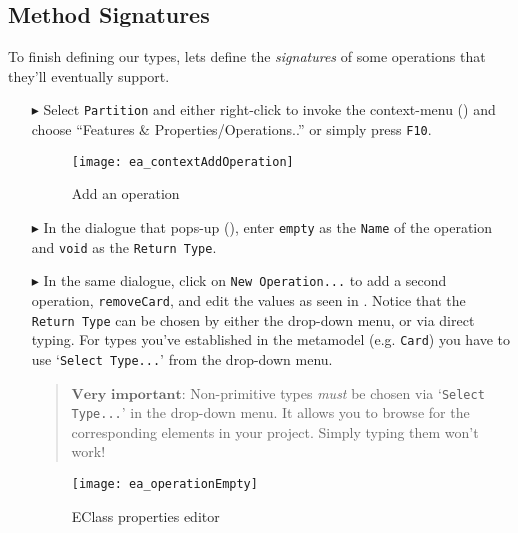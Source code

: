 \newpage
\subsection{Method Signatures}
\genHeader
\hypertarget{static:methods vis}{}

To finish defining our types, lets define the \emph{signatures} of some operations that they'll eventually support.

\begin{enumerate}

\item[$\blacktriangleright$] Select \texttt{Partition} and either right-click to invoke the context-menu ()  and choose ``Features \&
Properties/Operations..'' or simply press \texttt{F10}.

\begin{figure}[htbp]
	\centering
  \texttt{[image: ea\_contextAddOperation]}
	\caption{Add an operation}
	\label{ea:add_operation}
\end{figure}
\FloatBarrier

\item[$\blacktriangleright$] In the dialogue that pops-up (), enter \texttt{empty} as the \texttt{Name} of the operation and \texttt{void} as the \texttt{Return Type}.

\vspace{0.5cm}

\item[$\blacktriangleright$] In the same dialogue, click on \texttt{New Operation...} to add a second operation, \texttt{removeCard}, and edit the values as seen in 
. Notice that the \texttt{Return Type} can be chosen by either the drop-down menu, or via direct typing. For types you've established in
the metamodel (e.g. \texttt{Card}) you have to use `\texttt{Select Type...}' from the drop-down menu.
\vspace{-.3cm}
\begin{quote}
{ \small
$\textbf{Very important:}$ Non-primitive types \emph{must} be chosen via `\texttt{Select Type...}' in the drop-down menu. It allows you to browse for the corresponding elements in
your project. Simply typing them won't work!
}
\end{quote}

\begin{figure}[htbp]
	\centering
  	\texttt{[image: ea\_operationEmpty]}
	\caption{EClass properties editor}
	\label{ea:operation_properties}
\end{figure}



\end{enumerate}
